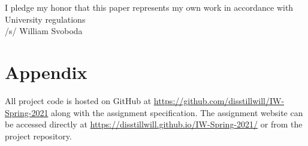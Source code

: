 \documentclass[pageno]{jpaper}
\begin{document}
I pledge my honor that this paper represents my own work in accordance with University regulations \\/s/ William Svoboda




\appendix

\section{Appendix}

All project code is hosted on GitHub at \url{https://github.com/disstillwill/IW-Spring-2021} along with the assignment specification. The assignment website can be accessed directly at \url{https://disstillwill.github.io/IW-Spring-2021/} or from the project repository.
\end{document}
